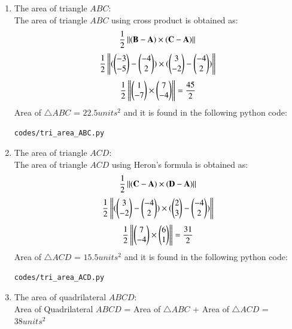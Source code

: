 \renewcommand{\theequation}{\theenumi}
\begin{enumerate}[label=\arabic*.,ref=\thesubsection.\theenumi]
\item The area of triangle $ABC$: \\
\solution The area of triangle $ABC$ using cross product is obtained as:
$$\frac{1}{2}\left\lVert(\mathbf{B}-\mathbf{A})\times(\mathbf{C}-\mathbf{A})\right\rVert$$
$$\frac{1}{2}\left\lVert(\begin{pmatrix}-3\\-5\end{pmatrix}-\begin{pmatrix}-4\\2\end{pmatrix})\times(\begin{pmatrix}3\\-2\end{pmatrix}-\begin{pmatrix}-4\\2\end{pmatrix})\right\rVert$$
$$\frac{1}{2}\left\lVert\begin{pmatrix}1\\-7\end{pmatrix} \times \begin{pmatrix}7\\-4\end{pmatrix}\right\rVert = \frac{45}{2}$$
Area of $\triangle{ABC}$ = $22.5 units^2$
and it is found in the following python code:
\begin{lstlisting}
codes/tri_area_ABC.py
\end{lstlisting} 

\item The area of triangle $ACD$: \\
\solution The area of triangle $ACD$ using Heron's formula is obtained as:
$$\frac{1}{2}\left\lVert(\mathbf{C}-\mathbf{A})\times(\mathbf{D}-\mathbf{A})\right\rVert$$
$$\frac{1}{2}\left\lVert(\begin{pmatrix}3\\-2\end{pmatrix}-\begin{pmatrix}-4\\2\end{pmatrix})\times(\begin{pmatrix}2\\3\end{pmatrix}-\begin{pmatrix}-4\\2\end{pmatrix})\right\rVert$$
$$\frac{1}{2}\left\lVert\begin{pmatrix}7\\-4\end{pmatrix} \times \begin{pmatrix}6\\1\end{pmatrix}\right\rVert = \frac{31}{2}$$
Area of $\triangle{ACD}$ = $15.5 units^2$
and it is found in the following python code:
\begin{lstlisting}
codes/tri_area_ACD.py
\end{lstlisting} 

\item The area of quadrilateral $ABCD$: \\
\solution Area of Quadrilateral $ABCD$ = Area of $\triangle{ABC}$ + Area of $\triangle{ACD}$ = $38 units^2$ 


\end{enumerate}
